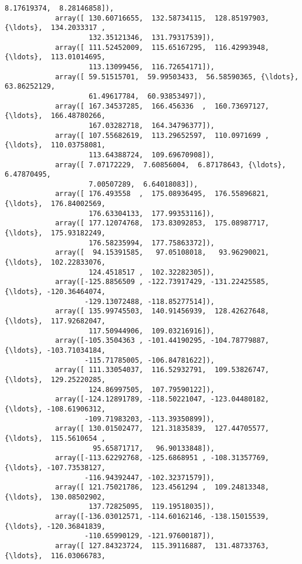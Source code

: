 \documentclass[11pt]{article}
\begin{document}
\begin{Verbatim}[commandchars=\\\{\}]
                    8.17619374,  8.28146858]),
            array([ 130.60716655,  132.58734115,  128.85197903, {\ldots},  134.2033317 ,
                    132.35121346,  131.79317539]),
            array([ 111.52452009,  115.65167295,  116.42993948, {\ldots},  113.01014695,
                    113.13099456,  116.72654171]),
            array([ 59.51515701,  59.99503433,  56.58590365, {\ldots},  63.86252129,
                    61.49617784,  60.93853497]),
            array([ 167.34537285,  166.456336  ,  160.73697127, {\ldots},  166.48780266,
                    167.03282718,  164.34796377]),
            array([ 107.55682619,  113.29652597,  110.0971699 , {\ldots},  110.03758081,
                    113.64388724,  109.69670908]),
            array([ 7.07172229,  7.60856004,  6.87178643, {\ldots},  6.47870495,
                    7.00507289,  6.64018083]),
            array([ 176.493558  ,  175.08936495,  176.55896821, {\ldots},  176.84002569,
                    176.63304133,  177.99353116]),
            array([ 177.12074768,  173.83092853,  175.08987717, {\ldots},  175.93182249,
                    176.58235994,  177.75863372]),
            array([  94.15391585,   97.05108018,   93.96290021, {\ldots},  102.22833076,
                    124.4518517 ,  102.32282305]),
            array([-125.8856509 , -122.73917429, -131.22425585, {\ldots}, -120.36464074,
                   -129.13072488, -118.85277514]),
            array([ 135.99745503,  140.91456939,  128.42627648, {\ldots},  117.92682047,
                    117.50944906,  109.03216916]),
            array([-105.3504363 , -101.44190295, -104.78779887, {\ldots}, -103.71034184,
                   -115.71785005, -106.84781622]),
            array([ 111.33054037,  116.52932791,  109.53826747, {\ldots},  129.25220285,
                    124.86997505,  107.79590122]),
            array([-124.12891789, -118.50221047, -123.04480182, {\ldots}, -108.61906312,
                   -109.71983203, -113.39350899]),
            array([ 130.01502477,  121.31835839,  127.44705577, {\ldots},  115.5610654 ,
                     95.65871717,   96.90133848]),
            array([-113.62292768, -125.6868951 , -108.31357769, {\ldots}, -107.73538127,
                   -116.94392447, -102.32371579]),
            array([ 121.75021786,  123.4561294 ,  109.24813348, {\ldots},  130.08502902,
                    137.72825095,  119.19518035]),
            array([-136.03012571, -114.60162146, -138.15015539, {\ldots}, -120.36841839,
                   -110.65990129, -121.97600187]),
            array([ 127.84323724,  115.39116887,  131.48733763, {\ldots},  116.03066783,

\end{Verbatim}
\end{document}

